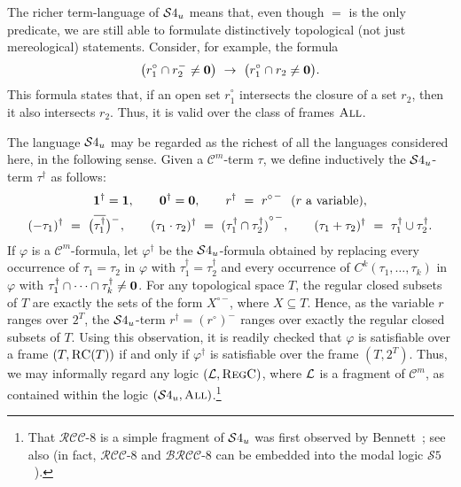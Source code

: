 \documentclass{LMCS}
\theoremstyle{plain}
\newcommand{\cBC}{\ensuremath{\mathcal{C}}}
\newcommand{\cBCm}{\ensuremath{\mathcal{C}^m}}
\newcommand{\BRCCE}{\ensuremath{\mathcal{BRCC}\text{-}8}}
\newcommand{\RCCE}{\ensuremath{\mathcal{RCC}\text{-}8}}\newcommand{\RCCEcc}{\ensuremath{\RCCE{}cc}}\newcommand{\RCCEc}{\ensuremath{\RCCE{}c}}
\newcommand{\ti}[2][]{#2^{\circ_{#1}}}
\newcommand{\tc}[2][]{#2^{-_{#1}}}
\newcommand{\All}{\textsc{All}}
\newcommand{\Regc}{\textsc{RegC}}
\begin{document}
The richer term-language of $\mathcal{S}4_u$ means that, even though $=$ is the
only predicate, we are still able to formulate distinctively
topological (not just mereological) statements. Consider, for example,
the formula
\begin{equation*}
\bigl(\ti{r}_1 \cap \tc{r}_2 \neq \zero\bigr) \ \rightarrow \ \bigl(\ti{r}_1 \cap r_2 \neq \zero\bigr).
\end{equation*}
This formula states that, if an open set $\ti{r}_1$ intersects the
closure of a set $r_2$, then it also intersects $r_2$. Thus, it is
valid over the class of frames $\All$.

The language $\mathcal{S}4_u$ may be regarded as the richest of all the
languages considered here, in the following sense.  Given a
$\cBC^m$-term $\tau$, we define inductively the $\mathcal{S}4_u$-term
$\tau^\dag$ as follows:
\begin{gather*}
\one^\dag = \one,\qquad \zero^\dag = \zero,\qquad r^\dag ~=~ \tc{{\ti{r}}} \ \ (r \text{ a variable}),\\
(-\tau_1)^\dag ~=~ \tc{\bigl(\overline{\tau_1^\dag}\bigr)},\qquad (\tau_1\cdot\tau_2)^\dag ~=~ \tc{{\ti{{(\tau_1^\dag\cap\tau_2^\dag)}}}}, \qquad (\tau_1+\tau_2)^\dag ~=~ \tau_1^\dag\cup\tau_2^\dag.
\end{gather*}
If $\varphi$ is a $\cBCm$-formula, let $\varphi^\dag$ be the
$\mathcal{S}4_u$-formula obtained by replacing every occurrence of $\tau_1 =
\tau_2$ in $\varphi$ with $\tau_1^\dag = \tau_2^\dag$ and every
occurrence of $C^k(\tau_1,\dots,\tau_k)$ in $\varphi$ with $\tau_1^\dag
\cap \dots \cap \tau_k^\dag \ne \mathbf{0}$. For any topological space $T$,
the regular closed subsets of $T$ are exactly the sets of the form
$\tc{{\ti{X}}}$, where $X \subseteq T$.  Hence, as the variable $r$
ranges over $2^T$, the $\mathcal{S}4_u$-term $r^\dag = \tc{(\ti{r})}$ ranges
over exactly the regular closed subsets of $T$.  Using this
observation, it is readily checked that $\varphi$ is satisfiable
over a frame $(T,\textsc{RC}(T))$ if and only if $\varphi^\dag$ is satisfiable over
the frame $(T,2^T)$. Thus, we may informally regard any logic $(\cL,
\Regc)$, where $\mathcal{L}$ is a fragment of $\cBC^m$, as contained within
the logic $(\SFU, \All)$.\footnote{That \RCCE{} is a simple fragment of $\mathcal{S}4_u$ was first
observed by Bennett~\cite{Bennett94}; see also \cite{RenzN97,Nutt99}
(in fact, \RCCE{} and \BRCCE{} can be embedded into the modal logic $\mathcal{S}5$~\cite{Wolter&Z02millenium}).}
\end{document}

